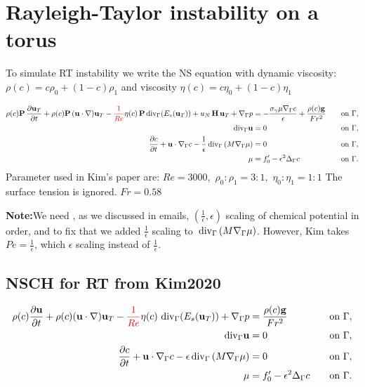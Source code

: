 \documentclass{article}
\newcommand{\vect}[1]{\boldsymbol{\mathbf{#1}}}
\newcommand{\bu}{\mathbf u}
\newcommand{\divG}{{\mathop{\,\rm div}}_{\Gamma}}
\newcommand{\gradG}{\nabla_{\Gamma}}
\newcommand{\nablaG}{\nabla_{\Gamma}}
\newcommand{\laplG}{\Delta_{\Gamma}}
\begin{document}
\section{Rayleigh-Taylor instability on a torus}

To simulate RT instability we write the NS equation with dynamic viscosity: $\rho(c)=c\rho_0+(1-c)\rho_1$ and viscosity $\eta(c)=c\eta_0+(1-c)\eta_1$

\begin{align}
\rho(c)\vect P\,\frac{\partial\vect u_T}{\partial t} + \rho(c)\vect P\,(\vect u\cdot\nabla)\vect u_T - {\color{red}\frac{1}{Re}}\eta(c)\,\vect P\divG(E_s(\vect u_T)) + u_N\,\vect H\,\vect u_T + \nabla_\Gamma p &=   - \frac{\sigma_\gamma \mu \nablaG c}{\epsilon} + \frac{\rho(c)\textbf{g}}{Fr^2} \quad &\text{on}~\Gamma,  \label{strongform-1} \\
\divG \bu & =0 \quad &\text{on}~\Gamma, \label{strongform-2}\\
\frac{\partial c}{\partial t} +\bu\cdot\nablaG c-  \frac{1}{\epsilon}\divG \left(M \gradG \mu \right)  &= 0 \quad &\text{on}~\Gamma \label{eq:sys_CH1}, \\
\mu &= f_0' - \epsilon^2 \laplG c \quad &\text{on}~\Gamma. \label{eq:sys_CH2}
\end{align}
Parameter used in Kim's \cite{YANG2020113382} paper are: $Re=3000,$ $\rho_0:\rho_1=3:1,$ $\eta_0:\eta_1=1:1$   The surface tension is ignored. $Fr=0.58$

{\color{red} \textbf{Note:}We need , as we discussed in emails, $(\frac{1}{\epsilon}, \epsilon)$ scaling of chemical potential in order, and to fix that we added $\frac{1}{\epsilon}$ scaling to $\divG \left(M \gradG \mu \right)$. However, Kim takes $Pe=\frac{1}{\epsilon}$, which $\epsilon$ scaling instead of $\frac{1}{\epsilon}$.}

\subsection{NSCH for RT from Kim2020\cite{YANG2020113382}}

\begin{align}
\rho(c) \frac{\partial\vect u}{\partial t} + \rho(c)(\vect u\cdot\nabla)\vect u_T - {\color{red}\frac{1}{Re}}\eta(c)\,\divG(E_s(\vect u_T)) + \nabla_\Gamma p &=  \frac{\rho(c)\textbf{g}}{Fr^2} \quad &\text{on}~\Gamma,   \\
\divG \bu & =0 \quad &\text{on}~\Gamma, \\
\frac{\partial c}{\partial t} +\bu\cdot\nablaG c-  \epsilon \divG \left(M \gradG \mu \right)  &= 0 \quad &\text{on}~\Gamma , \\
\mu &= f_0' - \epsilon^2 \laplG c \quad &\text{on}~\Gamma. 
\end{align}
\end{document}
